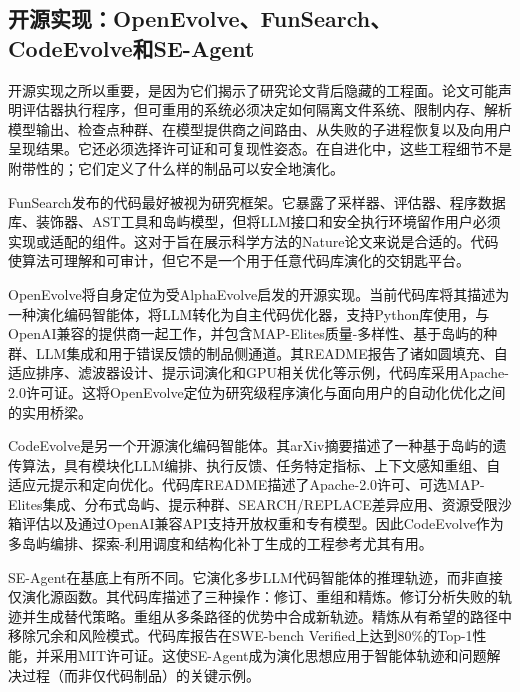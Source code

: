 \subsection{开源实现：OpenEvolve、FunSearch、CodeEvolve和SE-Agent}
\label{subsec:open-source-implementations}

开源实现之所以重要，是因为它们揭示了研究论文背后隐藏的工程面。论文可能声明评估器执行程序，但可重用的系统必须决定如何隔离文件系统、限制内存、解析模型输出、检查点种群、在模型提供商之间路由、从失败的子进程恢复以及向用户呈现结果。它还必须选择许可证和可复现性姿态。在自进化中，这些工程细节不是附带性的；它们定义了什么样的制品可以安全地演化。

FunSearch发布的代码最好被视为研究框架。它暴露了采样器、评估器、程序数据库、装饰器、AST工具和岛屿模型，但将LLM接口和安全执行环境留作用户必须实现或适配的组件。这对于旨在展示科学方法的Nature论文来说是合适的。代码使算法可理解和可审计，但它不是一个用于任意代码库演化的交钥匙平台。

OpenEvolve将自身定位为受AlphaEvolve启发的开源实现。当前代码库将其描述为一种演化编码智能体，将LLM转化为自主代码优化器，支持Python库使用，与OpenAI兼容的提供商一起工作，并包含MAP-Elites质量-多样性、基于岛屿的种群、LLM集成和用于错误反馈的制品侧通道。其README报告了诸如圆填充、自适应排序、滤波器设计、提示词演化和GPU相关优化等示例，代码库采用Apache-2.0许可证。这将OpenEvolve定位为研究级程序演化与面向用户的自动化优化之间的实用桥梁。

CodeEvolve是另一个开源演化编码智能体。其arXiv摘要描述了一种基于岛屿的遗传算法，具有模块化LLM编排、执行反馈、任务特定指标、上下文感知重组、自适应元提示和定向优化。代码库README描述了Apache-2.0许可、可选MAP-Elites集成、分布式岛屿、提示种群、SEARCH/REPLACE差异应用、资源受限沙箱评估以及通过OpenAI兼容API支持开放权重和专有模型。因此CodeEvolve作为多岛屿编排、探索-利用调度和结构化补丁生成的工程参考尤其有用。

SE-Agent在基底上有所不同。它演化多步LLM代码智能体的推理轨迹，而非直接仅演化源函数。其代码库描述了三种操作：修订、重组和精炼。修订分析失败的轨迹并生成替代策略。重组从多条路径的优势中合成新轨迹。精炼从有希望的路径中移除冗余和风险模式。代码库报告在SWE-bench Verified上达到80\%的Top-1性能，并采用MIT许可证。这使SE-Agent成为演化思想应用于智能体轨迹和问题解决过程（而非仅代码制品）的关键示例。

